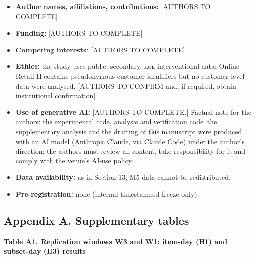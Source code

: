 \documentclass[
]{article}
\newcounter{none} %
\providecommand{\tightlist}{%
  \setlength{\itemsep}{0pt}\setlength{\parskip}{0pt}}
\begin{document}
\begin{itemize}
\tightlist
\item
  \textbf{Author names, affiliations, contributions:} {[}AUTHORS TO
  COMPLETE{]}
\item
  \textbf{Funding:} {[}AUTHORS TO COMPLETE{]}
\item
  \textbf{Competing interests:} {[}AUTHORS TO COMPLETE{]}
\item
  \textbf{Ethics:} the study uses public, secondary, non-interventional
  data; Online Retail II contains pseudonymous customer identifiers but
  no customer-level data were analysed. {[}AUTHORS TO CONFIRM and, if
  required, obtain institutional confirmation{]}
\item
  \textbf{Use of generative AI:} {[}AUTHORS TO COMPLETE.{]} Factual note
  for the authors: the experimental code, analysis and verification
  code, the supplementary analysis and the drafting of this manuscript
  were produced with an AI model (Anthropic Claude, via Claude Code)
  under the author's direction; the authors must review all content,
  take responsibility for it and comply with the venue's AI-use policy.
\item
  \textbf{Data availability:} as in Section 13; M5 data cannot be
  redistributed.
\item
  \textbf{Pre-registration:} none (internal timestamped freeze only).
\end{itemize}

\subsection{Appendix A. Supplementary
tables}\label{appendix-a.-supplementary-tables}

\textbf{Table A1. Replication windows W3 and W1: item-day (H1) and
subset-day (H3) results}
\end{document}
